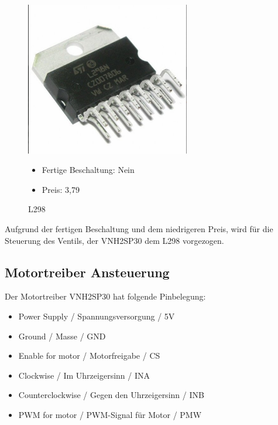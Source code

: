 \begin{figure}[H]
\begin{minipage}[t]{0.45\textwidth}
\begin{center}
\includegraphics[width=0.64\textwidth]{fig/L298}
\caption{L298}
\end{center}

\begin{itemize}
	\item{Fertige Beschaltung: Nein}
	\item{Preis: 3,79\textsf{\texteuro} \cite{preisL298}}
\end{itemize}

\end{minipage}
\end{figure} 

Aufgrund der fertigen Beschaltung und dem niedrigeren Preis, wird für die Steuerung des Ventils, der VNH2SP30 dem L298 vorgezogen. 

\subsection{Motortreiber Ansteuerung}
\label{sec:motortreiberAnsteuerung}

Der Motortreiber VNH2SP30 hat folgende Pinbelegung:

\begin{itemize}
	\item{Power Supply / Spannungsversorgung / 5V}
	\item{Ground / Masse / GND}
	\item{Enable for motor / Motorfreigabe / CS}
	\item{Clockwise / Im Uhrzeigersinn / INA}
	\item{Counterclockwise / Gegen den Uhrzeigersinn / INB}
	\item{PWM for motor / PWM-Signal für Motor / PMW}
\end{itemize}


